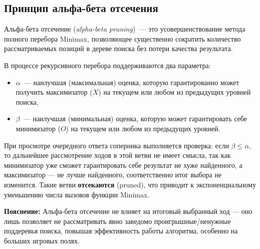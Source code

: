 \subsection{Принцип альфа-бета отсечения}

Альфа-бета отсечение (\textit{alpha-beta pruning})~— это усовершенствование метода полного перебора Minimax, позволяющее существенно сократить количество рассматриваемых позиций в дереве поиска без потери качества результата.

В процессе рекурсивного перебора поддерживаются два параметра:
\begin{itemize}
    \item $\alpha$~— наилучшая (максимальная) оценка, которую гарантированно может получить максимизатор ($X$) на текущем или любом из предыдущих уровней поиска,
    \item $\beta$~— наилучшая (минимальная) оценка, которую может гарантировать себе минимизатор ($O$) на текущем или любом из предыдущих уровней.
\end{itemize}

При просмотре очередного ответа соперника выполняется проверка:  
если $\beta \leq \alpha$, то дальнейшее рассмотрение ходов в этой ветви не имеет смысла, так как минимизатор уже сможет гарантировать себе результат не хуже найденного, а максимизатор — не лучше найденного, соответственно итог выбора не изменится.  
Такие ветви \textbf{отсекаются} (pruned), что приводит к экспоненциальному уменьшению числа вызовов функции Minimax.

\vspace{1em}

\textbf{Пояснение:}  
Альфа-бета отсечение не влияет на итоговый выбранный ход — оно лишь позволяет не рассматривать явно заведомо проигрышные/ненужные поддеревья поиска, повышая эффективность работы алгоритма, особенно на больших игровых полях.
